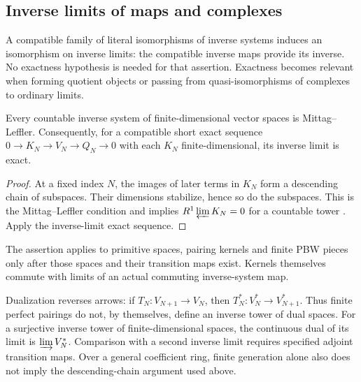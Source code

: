 \subsection{Inverse limits of maps and complexes}

A compatible family of literal isomorphisms of inverse systems
induces an isomorphism on inverse limits: the compatible inverse
maps provide its inverse. No exactness hypothesis is needed for
that assertion. Exactness becomes relevant when forming quotient
objects or passing from quasi-isomorphisms of complexes to ordinary
limits.

\begin{proposition}
\label{prop:bkm-finite-tower-ml}
Every countable inverse system of finite-dimensional vector spaces
is Mittag--Leffler. Consequently, for a compatible short exact
sequence $0\to K_N\to V_N\to Q_N\to0$ with each $K_N$
finite-dimensional, its inverse limit is exact.
\end{proposition}
\begin{proof}
At a fixed index $N$, the images of later terms in $K_N$ form a
descending chain of subspaces. Their dimensions stabilize, hence
so do the subspaces. This is the Mittag--Leffler condition and
implies $R^1\varprojlim K_N=0$ for a countable tower
\cite[Section~3.5]{WeibelHA}. Apply the inverse-limit exact sequence.
\end{proof}

The assertion applies to primitive spaces, pairing kernels and finite
PBW pieces only after those spaces and their transition maps exist.
Kernels themselves commute with limits of an actual commuting
inverse-system map.

Dualization reverses arrows: if
$T_N:V_{N+1}\to V_N$, then $T_N^*:V_N^*\to V_{N+1}^*$.
Thus finite perfect pairings do not, by themselves, define an
inverse tower of dual spaces. For a surjective inverse tower of
finite-dimensional spaces, the continuous dual of its limit is
$\varinjlim V_N^*$. Comparison with a second inverse limit requires
specified adjoint transition maps. Over a general coefficient ring,
finite generation alone also does not imply the descending-chain
argument used above.

